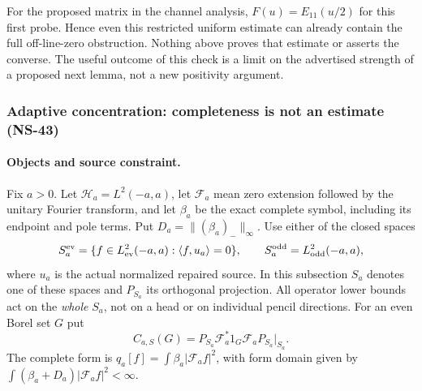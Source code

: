 \documentclass[11pt]{article}
\theoremstyle{remark}
\begin{document}
For the proposed matrix in the channel analysis, $F(u)=E_{11}(u/2)$
for this first probe. Hence even this restricted uniform estimate can
already contain the full off-line-zero obstruction. Nothing above
proves that estimate or asserts the converse. The useful outcome of
this check is a limit on the advertised strength of a proposed next
lemma, not a new positivity argument.


\subsubsection{Adaptive concentration: completeness is not an estimate (NS-43)}
\label{ns43-conc-sec}

\paragraph{Objects and source constraint.}
Fix $a>0$. Let $\mathcal H_a=L^2(-a,a)$, let $\mathcal F_a$ mean
zero extension followed by the unitary Fourier transform, and let
$\beta_a$ be the exact complete symbol, including its endpoint and pole
terms. Put $D_a=\| (\beta_a)_-\|_\infty$.
Use either of the closed spaces
\[
 S_a^{\rm ev}=\{f\in L^2_{\rm ev}(-a,a):\langle f,u_a\rangle=0\},
 \qquad S_a^{\rm odd}=L^2_{\rm odd}(-a,a),
\]
where $u_a$ is the actual normalized repaired source.
In this subsection $S_a$ denotes one of these spaces and $P_{S_a}$
its orthogonal projection. All operator lower bounds act on the
\emph{whole} $S_a$, not on a head or on individual pencil directions.
For an even Borel set $G$ put
\[
 C_{a,S}(G)=P_{S_a}\mathcal F_a^*1_G\mathcal F_aP_{S_a}|_{S_a}.
\]
The complete form is
$q_a[f]=\int\beta_a|\mathcal F_af|^2$, with form domain given by
$\int(\beta_a+D_a)|\mathcal F_af|^2<\infty$.
\end{document}
